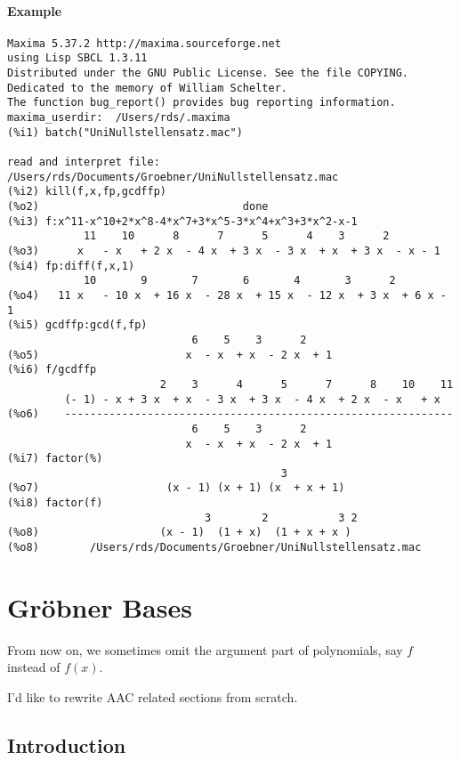 \documentclass[11pt]{book}
\begin{document}
\subsubsection{Example}
\begin{verbatim}
Maxima 5.37.2 http://maxima.sourceforge.net
using Lisp SBCL 1.3.11
Distributed under the GNU Public License. See the file COPYING.
Dedicated to the memory of William Schelter.
The function bug_report() provides bug reporting information.
maxima_userdir:  /Users/rds/.maxima 
(%i1) batch("UniNullstellensatz.mac")

read and interpret file: /Users/rds/Documents/Groebner/UniNullstellensatz.mac
(%i2) kill(f,x,fp,gcdffp)
(%o2)                                done
(%i3) f:x^11-x^10+2*x^8-4*x^7+3*x^5-3*x^4+x^3+3*x^2-x-1
            11    10      8      7      5      4    3      2
(%o3)      x   - x   + 2 x  - 4 x  + 3 x  - 3 x  + x  + 3 x  - x - 1
(%i4) fp:diff(f,x,1)
            10       9       7       6       4       3      2
(%o4)   11 x   - 10 x  + 16 x  - 28 x  + 15 x  - 12 x  + 3 x  + 6 x - 1
(%i5) gcdffp:gcd(f,fp)
                             6    5    3      2
(%o5)                       x  - x  + x  - 2 x  + 1
(%i6) f/gcdffp
                        2    3      4      5      7      8    10    11
         (- 1) - x + 3 x  + x  - 3 x  + 3 x  - 4 x  + 2 x  - x   + x
(%o6)    -------------------------------------------------------------
                             6    5    3      2
                            x  - x  + x  - 2 x  + 1
(%i7) factor(%)
                                           3
(%o7)                    (x - 1) (x + 1) (x  + x + 1)
(%i8) factor(f)
                               3        2           3 2
(%o8)                   (x - 1)  (1 + x)  (1 + x + x )
(%o8)        /Users/rds/Documents/Groebner/UniNullstellensatz.mac

\end{verbatim}


\chapter{Gr\"obner Bases}
From now on, we sometimes omit the argument part of polynomials, say $f$ instead of $f(x)$.

I'd like to rewrite AAC related sections from scratch.

\section{Introduction}
\end{document}
